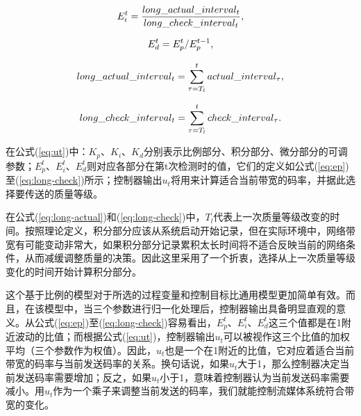 \begin{equation}
\vspace{10pt}
\label{eq:ei}
E_i^t = \frac{{long\_actual\_interva{l_t}}}{{long\_check\_interva{l_t}}} ,
\end{equation}

\begin{equation}
\vspace{10pt}
\label{eq:ed}
E_d^t = E_p^t/E_p^{t - 1} ,
\end{equation}

\begin{equation}
\vspace{10pt}
\label{eq:long-actual}
long\_actual\_interva{l_t} = \sum\limits_{\tau = {T_l}}^t {actual\_interva{l_\tau}} ,
\end{equation}

\begin{equation}
\vspace{10pt}
\label{eq:long-check}
long\_check\_interva{l_t} = \sum\limits_{\tau = {T_l}}^t {check\_interva{l_\tau}} .
\end{equation}

在公式(\ref{eq:ut})中：$K_p$、$K_i$、$K_d$分别表示比例部分、积分部分、微分部分的可调参数；$E_p^t$、$E_i^t$、$E_d^t$则对应各部分在第t次检测时的值，它们的定义如公式(\ref{eq:ep})至(\ref{eq:long-check})所示；控制器输出$u_t$将用来计算适合当前带宽的码率，并据此选择要传送的质量等级。

在公式(\ref{eq:long-actual})和(\ref{eq:long-check})中，$T_l$代表上一次质量等级改变的时间。按照理论定义，积分部分应该从系统启动开始记录，但在实际环境中，网络带宽有可能变动非常大，如果积分部分记录累积太长时间将不适合反映当前的网络条件，从而减缓调整质量的决策。因此这里采用了一个折衷，选择从上一次质量等级变化的时间开始计算积分部分。

这个基于比例的模型对于所选的过程变量和控制目标比通用模型更加简单有效。而且，在该模型中，当三个参数进行归一化处理后，控制器输出具备明显直观的意义。从公式(\ref{eq:ep})至(\ref{eq:long-check})容易看出，$E_p^t$、$E_i^t$、$E_d^t$这三个值都是在1附近波动的比值；而根据公式(\ref{eq:ut})，控制器输出$u_t$可以被视作这三个比值的加权平均（三个参数作为权值）。因此，$u_t$也是一个在1附近的比值，它对应着适合当前带宽的码率与当前发送码率的关系。换句话说，如果$u_t$大于1，那么控制器决定当前发送码率需要增加；反之，如果$u_t$小于1，意味着控制器认为当前发送码率需要减小。用$u_t$作为一个乘子来调整当前发送的码率，我们就能控制流媒体系统符合带宽的变化。

